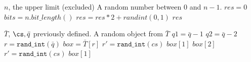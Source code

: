 \begin{algorithm}[htb]
\caption{Generating a random integer} 
\label{algo:tableXX}
	\begin{algorithmic}[1]
        \renewcommand{\algorithmicrequire}{\textbf{Input:}}
        \renewcommand{\algorithmicensure}{\textbf{Output:}}
        \Require $n$, the upper limit (excluded)
        \Ensure  A random number between $0$ and $n-1$.
                \State $res = 0$
                \State $bits = n.bit\_length()$ 
                    \State $res = res * 2 + randint(0, 1)$ 
                \EndFor
                    \State \Return $res$
                \EndIf
            \EndWhile
        \EndFunction
	\end{algorithmic}   
 \end{algorithm}

\begin{algorithm}[htb]
\caption{Random sampling in $\bar{T}$} 
\label{algo:tableXY}
	\begin{algorithmic}[1]
        \renewcommand{\algorithmicrequire}{\textbf{Input:}}
        \renewcommand{\algorithmicensure}{\textbf{Output:}}
        \Require $\bar{T}$, $\cs, \bar{q}$  previously defined.
        \Ensure A random object from $\bar{T}$
            \State $q1 = \bar{q} - 1$
            \State $q2 = \bar{q} - 2$
                \State $r = \texttt{rand\_int}(\bar{q})$
                \State $box = \bar{T}[r]$
                 
                    \State $r' = \texttt{rand\_int}(cs)$
                        \State \Return $box[1]$
                    \Else
                        \State \Return $box[2]$
                    \EndIf
                 
                    \State $r' = \texttt{rand\_int}(cs)$
                        \State \Return $box[1]$
                    \EndIf
                \EndIf
            \EndWhile
        \EndFunction
    \end{algorithmic}
\end{algorithm}
